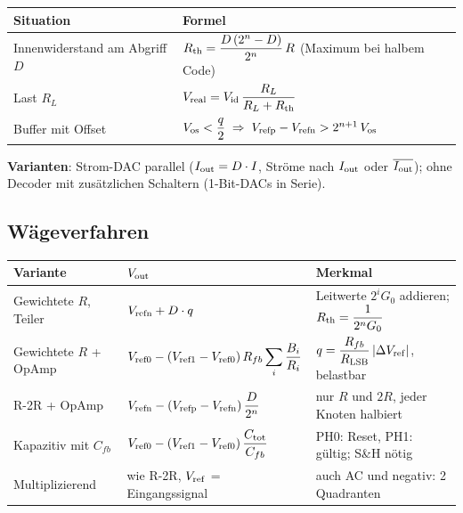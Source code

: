 \vspace{4pt}
{\renewcommand{\arraystretch}{1.7}
\begin{tabularx}{\columnwidth}{@{}l X@{}}
	\toprule
	\textbf{Situation}             & \textbf{Formel} \\ \midrule
	Innenwiderstand am Abgriff $D$ & $R_{\rm th} = \dfrac{D\,(2^n-D)}{2^n}\,R$ \quad (Maximum bei halbem Code) \\
	Last $R_L$                     & $V_{\rm real} = V_{\rm id}\,\dfrac{R_L}{R_L + R_{\rm th}}$ \\
	Buffer mit Offset              & $V_{\rm os} < \dfrac{q}{2} \;\Rightarrow\; V_{\rm refp}-V_{\rm refn} > 2^{n+1}\,V_{\rm os}$ \\ \bottomrule
\end{tabularx}}

\textbf{Varianten}: Strom-DAC parallel ($I_{\rm out} = D\cdot I$, Ströme nach $I_{\rm out}$ oder $\overline{I_{\rm out}}$); \;
ohne Decoder mit zusätzlichen Schaltern (1-Bit-DACs in Serie).


\subsection{Wägeverfahren}\label{sec:dac-waege}

{\renewcommand{\arraystretch}{1.75}
\begin{tabularx}{\columnwidth}{@{}l l X@{}}
	\toprule
	\textbf{Variante}        & \textbf{$V_{\rm out}$}                    & \textbf{Merkmal} \\ \midrule
	Gewichtete $R$, Teiler   & $V_{\rm refn} + D\cdot q$
	                         & Leitwerte $2^i G_0$ addieren; \; $R_{\rm th} = \dfrac{1}{2^n G_0}$ \\
	Gewichtete $R$ + OpAmp   & $V_{\rm ref0} - (V_{\rm ref1}-V_{\rm ref0})\,R_{fb}\displaystyle\sum_i \frac{B_i}{R_i}$
	                         & $q = \dfrac{R_{fb}}{R_{\rm LSB}}\,|\Delta V_{\rm ref}|$, \; belastbar \\
	R-2R + OpAmp             & $V_{\rm refn} - (V_{\rm refp}-V_{\rm refn})\,\dfrac{D}{2^n}$
	                         & nur $R$ und $2R$, jeder Knoten halbiert \\
	Kapazitiv mit $C_{fb}$   & $V_{\rm ref0} - (V_{\rm ref1}-V_{\rm ref0})\,\dfrac{C_{\rm tot}}{C_{fb}}$
	                         & PH0: Reset, PH1: gültig; S\&H nötig \\
	Multiplizierend          & wie R-2R, $V_{\rm ref}$ = Eingangssignal
	                         & auch AC und negativ: 2 Quadranten \\ \bottomrule
\end{tabularx}}

